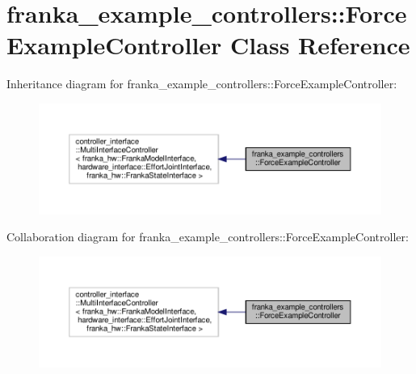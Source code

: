 \hypertarget{classfranka__example__controllers_1_1_force_example_controller}{}\section{franka\+\_\+example\+\_\+controllers\+:\+:Force\+Example\+Controller Class Reference}
\label{classfranka__example__controllers_1_1_force_example_controller}


Inheritance diagram for franka\+\_\+example\+\_\+controllers\+:\+:Force\+Example\+Controller\+:
\nopagebreak
\begin{figure}[H]
\begin{center}
\leavevmode
\includegraphics[width=350pt]{classfranka__example__controllers_1_1_force_example_controller__inherit__graph}
\end{center}
\end{figure}


Collaboration diagram for franka\+\_\+example\+\_\+controllers\+:\+:Force\+Example\+Controller\+:
\nopagebreak
\begin{figure}[H]
\begin{center}
\leavevmode
\includegraphics[width=350pt]{classfranka__example__controllers_1_1_force_example_controller__coll__graph}
\end{center}
\end{figure}
